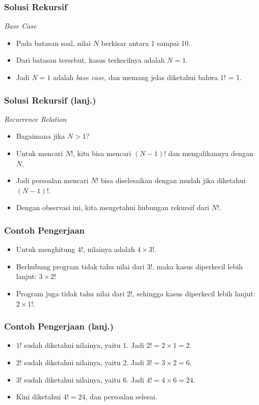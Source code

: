 \begin{frame}
\frametitle{Solusi Rekursif}
\textit{Base Case}
\begin{itemize}
  \item Pada batasan soal, nilai $N$ berkisar antara 1 sampai 10.
  \item Dari batasan tersebut, kasus terkecilnya adalah $N=1$.
  \item Jadi $N=1$ adalah \textit{base case}, dan memang jelas diketahui bahwa 1! = 1.
\end{itemize}
\end{frame}

\begin{frame}
\frametitle{Solusi Rekursif (lanj.) }
\textit{Recurrence Relation}
\begin{itemize}
  \item Bagaimana jika $N > 1$?
  \item Untuk mencari $N!$, kita bisa mencari $(N-1)!$ dan mengalikannya dengan $N$.
  \item Jadi persoalan mencari $N!$ bisa diselesaikan dengan mudah jika diketahui $(N-1)!$.
  \item Dengan observasi ini, kita mengetahui hubungan rekursif dari $N!$. 
\end{itemize}
\end{frame}

\begin{frame}
\frametitle{Contoh Pengerjaan}
\begin{itemize}
  \item Untuk menghitung $4!$, nilainya adalah $4 \times 3!$.
  \item Berhubung program tidak tahu nilai dari $3!$, maka kasus diperkecil lebih lanjut: $3 \times 2!$
  \item Program juga tidak tahu nilai dari $2!$, sehingga kasus diperkecil lebih lanjut: $2 \times 1!$.
\end{itemize}
\end{frame}

\begin{frame}
\frametitle{Contoh Pengerjaan (lanj.)}
\begin{itemize}
  \item $1!$ sudah diketahui nilainya, yaitu $1$. Jadi $2! = 2 \times 1 = 2$.
  \item $2!$ sudah diketahui nilainya, yaitu $2$. Jadi $3! = 3 \times 2 = 6$.
  \item $3!$ sudah diketahui nilainya, yaitu $6$. Jadi $4! = 4 \times 6 = 24$.
  \item Kini diketahui $4! = 24$, dan persoalan selesai.
\end{itemize}
\end{frame}

